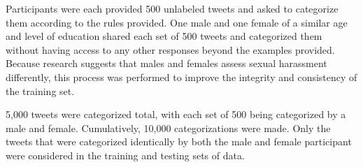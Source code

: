 Participants were each provided 500 unlabeled tweets and asked to categorize them according to the rules provided. One male and one female of a similar age and level of education shared each set of 500 tweets and categorized them without having access to any other responses beyond the examples provided. Because research suggests that males and females assess sexual harassment differently, this process was performed to improve the integrity and consistency of the training set.

5,000 tweets were categorized total, with each set of 500 being categorized by a male and female. Cumulatively, 10,000 categorizations were made. Only the tweets that were categorized identically by both the male and female participant were considered in the training and testing sets of data.
